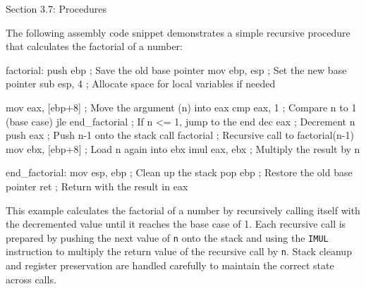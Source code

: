 \begin{notes}{Section 3.7: Procedures}
    \begin{highlight}
        The following assembly code snippet demonstrates a simple recursive procedure that calculates the factorial of a number:
    
    \begin{code}[Assembly]
    factorial:
        push ebp                    ; Save the old base pointer
        mov ebp, esp                ; Set the new base pointer
        sub esp, 4                  ; Allocate space for local variables if needed

        mov eax, [ebp+8]            ; Move the argument (n) into eax
        cmp eax, 1                  ; Compare n to 1 (base case)
        jle end_factorial           ; If n <= 1, jump to the end
        dec eax                     ; Decrement n
        push eax                    ; Push n-1 onto the stack
        call factorial              ; Recursive call to factorial(n-1)
        mov ebx, [ebp+8]            ; Load n again into ebx
        imul eax, ebx               ; Multiply the result by n

    end_factorial:
        mov esp, ebp                ; Clean up the stack
        pop ebp                     ; Restore the old base pointer
        ret                         ; Return with the result in eax
    \end{code}
    
        This example calculates the factorial of a number by recursively calling itself with the decremented value until it reaches the base case of 1. Each recursive call is prepared by pushing the 
        next value of \texttt{n} onto the stack and using the \texttt{IMUL} instruction to multiply the return value of the recursive call by \texttt{n}. Stack cleanup and register preservation are 
        handled carefully to maintain the correct state across calls.
    \end{highlight}    
\end{notes}